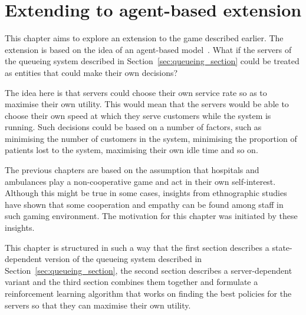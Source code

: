 \chapter{Extending to agent-based extension}

This chapter aims to explore an extension to the game described earlier.
The extension is based on the idea of an agent-based
model~\cite{de2014agent, fetta2012peter, knight2012modelling}.
What if the servers of the queueing system described in
Section~\ref{sec:queueing_section} could be treated as entities that could make
their own decisions?

The idea here is that servers could choose their own service rate so as to
maximise their own utility.
This would mean that the servers would be able to choose their own speed at
which they serve customers while the system is running.
Such decisions could be based on a number of factors, such as minimising the
number of customers in the system, minimising the proportion of patients lost
to the system, maximising their own idle time and so on.

The previous chapters are based on the assumption that hospitals and ambulances
play a non-cooperative game and act in their own self-interest.
Although this might be true in some cases, insights from ethnographic
studies~\cite{allen2004understanding} have shown that some cooperation and
empathy can be found among staff in such gaming environment.
The motivation for this chapter was initiated by these insights.

This chapter is structured in such a way that the first section describes a
state-dependent version of the queueing system described in
Section~\ref{sec:queueing_section}, the second section describes
a server-dependent variant and the third section combines them together and
formulate a reinforcement learning algorithm that works on finding the best
policies for the servers so that they can maximise their own utility.











